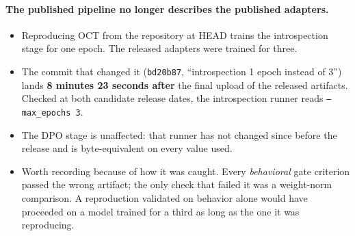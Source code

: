\documentclass{article}
\begin{document}
\paragraph{The published pipeline no longer describes the published adapters.}
\begin{itemize}
    \item Reproducing OCT from the repository at HEAD trains the introspection stage for one epoch. The released adapters were trained for three.
    \item The commit that changed it (\texttt{bd20b87}, ``introspection 1 epoch instead of 3'') lands \textbf{8 minutes 23 seconds after} the final upload of the released artifacts. Checked at both candidate release dates, the introspection runner reads \texttt{--max\_epochs 3}.
    \item The DPO stage is unaffected: that runner has not changed since before the release and is byte-equivalent on every value used.
    \item Worth recording because of how it was caught. Every \emph{behavioral} gate criterion passed the wrong artifact; the only check that failed it was a weight-norm comparison. A reproduction validated on behavior alone would have proceeded on a model trained for a third as long as the one it was reproducing.
\end{itemize}
\end{document}
